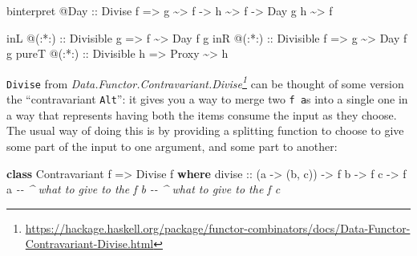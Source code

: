 \documentclass[]{article}
\newenvironment{Shaded}{}{}
\newcommand{\CommentTok}[1]{\textcolor[rgb]{0.38,0.63,0.69}{\textit{#1}}}
\newcommand{\DataTypeTok}[1]{\textcolor[rgb]{0.56,0.13,0.00}{#1}}
\newcommand{\KeywordTok}[1]{\textcolor[rgb]{0.00,0.44,0.13}{\textbf{#1}}}
\newcommand{\NormalTok}[1]{#1}
\newcommand{\OperatorTok}[1]{\textcolor[rgb]{0.40,0.40,0.40}{#1}}
\newcommand{\OtherTok}[1]{\textcolor[rgb]{0.00,0.44,0.13}{#1}}
\renewcommand{\href}[2]{#2\footnote{\url{#1}}}
\begin{document}
\begin{itemize}
\begin{Shaded}
\begin{Highlighting}[]
\NormalTok{binterpret }\OperatorTok{@}\DataTypeTok{Day}
\OtherTok{    ::} \DataTypeTok{Divise}\NormalTok{ f}
    \OtherTok{=\textgreater{}}\NormalTok{ g }\OperatorTok{\textasciitilde{}\textgreater{}}\NormalTok{ f}
    \OtherTok{{-}\textgreater{}}\NormalTok{ h }\OperatorTok{\textasciitilde{}\textgreater{}}\NormalTok{ f}
    \OtherTok{{-}\textgreater{}} \DataTypeTok{Day}\NormalTok{ g h }\OperatorTok{\textasciitilde{}\textgreater{}}\NormalTok{ f}

\NormalTok{inL   }\OperatorTok{@}\OtherTok{(:*:) ::} \DataTypeTok{Divisible}\NormalTok{ g }\OtherTok{=\textgreater{}}\NormalTok{ f     }\OperatorTok{\textasciitilde{}\textgreater{}} \DataTypeTok{Day}\NormalTok{ f g}
\NormalTok{inR   }\OperatorTok{@}\OtherTok{(:*:) ::} \DataTypeTok{Divisible}\NormalTok{ f }\OtherTok{=\textgreater{}}\NormalTok{ g     }\OperatorTok{\textasciitilde{}\textgreater{}} \DataTypeTok{Day}\NormalTok{ f g}
\NormalTok{pureT }\OperatorTok{@}\OtherTok{(:*:) ::} \DataTypeTok{Divisible}\NormalTok{ h }\OtherTok{=\textgreater{}} \DataTypeTok{Proxy} \OperatorTok{\textasciitilde{}\textgreater{}}\NormalTok{ h}
\end{Highlighting}
\end{Shaded}

  \texttt{Divise} from
  \emph{\href{https://hackage.haskell.org/package/functor-combinators/docs/Data-Functor-Contravariant-Divise.html}{Data.Functor.Contravariant.Divise}}
  can be thought of some version the ``contravariant \texttt{Alt}'': it gives
  you a way to merge two \texttt{f\ a}s into a single one in a way that
  represents having both the items consume the input as they choose. The usual
  way of doing this is by providing a splitting function to choose to give some
  part of the input to one argument, and some part to another:

\begin{Shaded}
\begin{Highlighting}[]
\KeywordTok{class} \DataTypeTok{Contravariant}\NormalTok{ f }\OtherTok{=\textgreater{}} \DataTypeTok{Divise}\NormalTok{ f }\KeywordTok{where}
\OtherTok{    divise ::}\NormalTok{ (a }\OtherTok{{-}\textgreater{}}\NormalTok{ (b, c)) }\OtherTok{{-}\textgreater{}}\NormalTok{ f b }\OtherTok{{-}\textgreater{}}\NormalTok{ f c }\OtherTok{{-}\textgreater{}}\NormalTok{ f a}
                  \CommentTok{{-}{-} \^{} what to give to the \textquotesingle{}f b\textquotesingle{}}
                     \CommentTok{{-}{-} \^{} what to give to the \textquotesingle{}f c\textquotesingle{}}
\end{Highlighting}
\end{Shaded}


\end{itemize}
\end{document}
